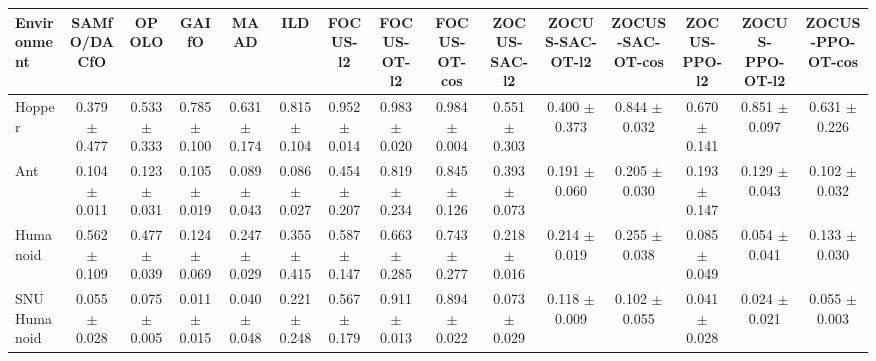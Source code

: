 \begin{tabular}{lcccccccccccccc}
\toprule
Environment & SAMfO/DACfO & OPOLO & GAIfO & MAAD & ILD & FOCUS-l2 & FOCUS-OT-l2 & FOCUS-OT-cos & ZOCUS-SAC-l2 & ZOCUS-SAC-OT-l2 & ZOCUS-SAC-OT-cos & ZOCUS-PPO-l2 & ZOCUS-PPO-OT-l2 & ZOCUS-PPO-OT-cos \\
\midrule
Hopper & 0.379 $\pm$ 0.477 & 0.533 $\pm$ 0.333 & 0.785 $\pm$ 0.100 & 0.631 $\pm$ 0.174 & 0.815 $\pm$ 0.104 & 0.952 $\pm$ 0.014 & 0.983 $\pm$ 0.020 & 0.984 $\pm$ 0.004 & 0.551 $\pm$ 0.303 & 0.400 $\pm$ 0.373 & 0.844 $\pm$ 0.032 & 0.670 $\pm$ 0.141 & 0.851 $\pm$ 0.097 & 0.631 $\pm$ 0.226 \\
Ant & 0.104 $\pm$ 0.011 & 0.123 $\pm$ 0.031 & 0.105 $\pm$ 0.019 & 0.089 $\pm$ 0.043 & 0.086 $\pm$ 0.027 & 0.454 $\pm$ 0.207 & 0.819 $\pm$ 0.234 & 0.845 $\pm$ 0.126 & 0.393 $\pm$ 0.073 & 0.191 $\pm$ 0.060 & 0.205 $\pm$ 0.030 & 0.193 $\pm$ 0.147 & 0.129 $\pm$ 0.043 & 0.102 $\pm$ 0.032 \\
Humanoid & 0.562 $\pm$ 0.109 & 0.477 $\pm$ 0.039 & 0.124 $\pm$ 0.069 & 0.247 $\pm$ 0.029 & 0.355 $\pm$ 0.415 & 0.587 $\pm$ 0.147 & 0.663 $\pm$ 0.285 & 0.743 $\pm$ 0.277 & 0.218 $\pm$ 0.016 & 0.214 $\pm$ 0.019 & 0.255 $\pm$ 0.038 & 0.085 $\pm$ 0.049 & 0.054 $\pm$ 0.041 & 0.133 $\pm$ 0.030 \\
SNU Humanoid & 0.055 $\pm$ 0.028 & 0.075 $\pm$ 0.005 & 0.011 $\pm$ 0.015 & 0.040 $\pm$ 0.048 & 0.221 $\pm$ 0.248 & 0.567 $\pm$ 0.179 & 0.911 $\pm$ 0.013 & 0.894 $\pm$ 0.022 & 0.073 $\pm$ 0.029 & 0.118 $\pm$ 0.009 & 0.102 $\pm$ 0.055 & 0.041 $\pm$ 0.028 & 0.024 $\pm$ 0.021 & 0.055 $\pm$ 0.003 \\
\bottomrule
\end{tabular}
